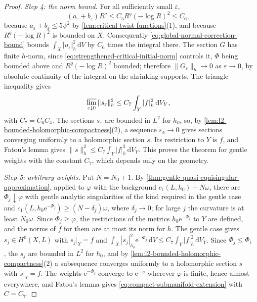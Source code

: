 \begin{proof}
\emph{Step 4: the norm bound.} For all sufficiently small $\varepsilon$,
\[
 (a_\varepsilon+b_\varepsilon)R^q
     \leq C_5 R^q(-\log R)^2\leq C_6,
\]
because $a_\varepsilon+b_\varepsilon\leq5\psi^2$ by \cref{lem:critical-twist-functions}(1), and because $R^q(-\log R)^2$ is bounded on $X$. Consequently \eqref{eq:global-normal-correction-bound} bounds $\int_X|u_\varepsilon|_h^2\,\mathrm dV$ by $C_6$ times the integral there. The section $G$ has finite $h$-norm, since \eqref{eq:strengthened-critical-initial-norm} controls it, $\Phi$ being bounded above and $R^q(-\log R)^2$ bounded; therefore $\|G_\varepsilon\|_h\to0$ as $\varepsilon\to0$, by absolute continuity of the integral on the shrinking supports. The triangle inequality gives
\[
 \varlimsup_{\varepsilon\downarrow0}\|s_\varepsilon\|_h^2
            \leq C_7\int_Y|f|_h^2\,\mathrm dV_Y,
\]
with $C_7=C_6C_4$. The sections $s_\varepsilon$ are bounded in $L^2$ for $h_0$, so, by \cref{lem:l2-bounded-holomorphic-compactness}(2), a sequence $\varepsilon_k\to0$ gives sections converging uniformly to a holomorphic section $s$. Its restriction to $Y$ is $f$, and Fatou's lemma gives $\|s\|_h^2\leq C_7\int_Y|f|_h^2\,\mathrm dV_Y$. This proves the theorem for gentle weights with the constant $C_7$, which depends only on the geometry.

\emph{Step 5: arbitrary weights.} Put $N=N_0+1$. By \cref{thm:gentle-quasi-equisingular-approximation}, applied to $\varphi$ with the background $c_1(L,h_0)-N\omega$, there are $\Phi_j\downarrow\varphi$ with gentle analytic singularities of the kind required in the gentle case and $c_1(L,h_0\mathrm e^{-\Phi_j})\geq(N-\delta_j)\omega$, where $\delta_j\to0$; for large $j$ the curvature is at least $N_0\omega$. Since $\Phi_j\geq\varphi$, the restrictions of the metrics $h_0\mathrm e^{-\Phi_j}$ to $Y$ are defined, and the norms of $f$ for them are at most its norm for $h$. The gentle case gives $s_j\in H^0(X,L)$ with $s_j|_Y=f$ and $\int_X|s_j|_{h_0}^2\mathrm e^{-\Phi_j}\,\mathrm dV\leq C_7\int_Y|f|_h^2\,\mathrm dV_Y$. Since $\Phi_j\leq\Phi_1$, the $s_j$ are bounded in $L^2$ for $h_0$, and by \cref{lem:l2-bounded-holomorphic-compactness}(2) a subsequence converges uniformly to a holomorphic section $s$ with $s|_Y=f$. The weights $\mathrm e^{-\Phi_j}$ converge to $\mathrm e^{-\varphi}$ wherever $\varphi$ is finite, hence almost everywhere, and Fatou's lemma gives \eqref{eq:compact-submanifold-extension} with $C=C_7$.
\end{proof}

